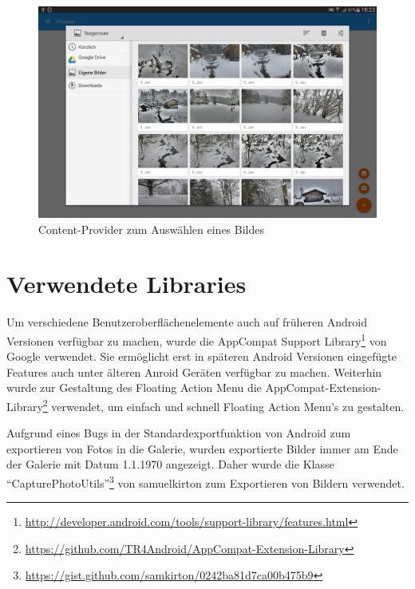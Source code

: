 \begin{figure}[H]
\centering
\includegraphics[scale=0.17]{images/screenshots/content_provider.png}
\caption{Content-Provider zum Auswählen eines Bildes}
\label{label:content_provider}
\end{figure}

\section{Verwendete Libraries}
Um verschiedene Benutzeroberflächenelemente auch auf früheren Android Versionen verfügbar zu machen, wurde die AppCompat Support Library\footnote{\url{http://developer.android.com/tools/support-library/features.html}} von Google verwendet. Sie ermöglicht erst in späteren Android Versionen eingefügte Features auch unter älteren Anroid Geräten verfügbar zu machen. Weiterhin wurde zur Gestaltung des Floating Action Menu die AppCompat-Extension-Library\footnote{\url{https://github.com/TR4Android/AppCompat-Extension-Library}} verwendet, um einfach und schnell Floating Action Menu's zu gestalten.

Aufgrund eines Bugs in der Standardexportfunktion von Android zum exportieren von Fotos in die Galerie, wurden exportierte Bilder immer am Ende der Galerie mit Datum 1.1.1970 angezeigt. Daher wurde die Klasse \enquote{CapturePhotoUtils}\footnote{\url{https://gist.github.com/samkirton/0242ba81d7ca00b475b9}} von samuelkirton zum Exportieren von Bildern verwendet.